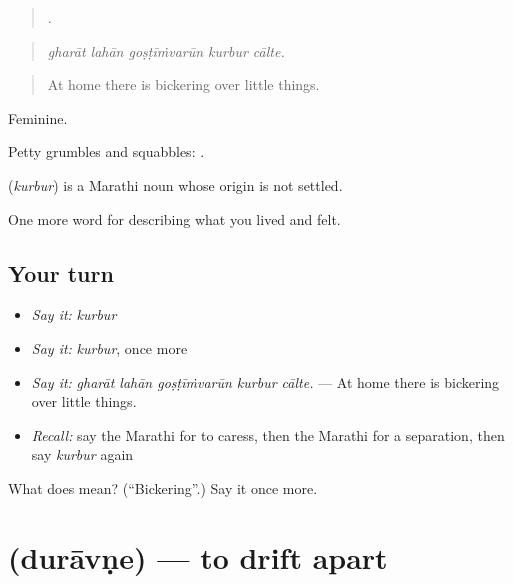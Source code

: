 \begin{quote}
    .
\end{quote}

\begin{quote}
\emph{gharāt lahān goṣṭīṁvarūn kurbur cālte.}
\end{quote}

\begin{quote}
At home there is bickering over little things.
\end{quote}

Feminine.

Petty grumbles and squabbles:  .

\begin{cousinweb}
\textbf{} (\emph{kurbur}) is a Marathi noun whose origin is not settled.
\end{cousinweb}

\begin{grammarlens}[title={What you've built}]
One more word for describing what you lived and felt.
\end{grammarlens}

\subsection*{Your turn}
\begin{itemize}
\raggedright
  \item \emph{Say it:} \emph{kurbur}
  \item \emph{Say it:} \emph{kurbur}, once more
  \item \emph{Say it:} \emph{gharāt lahān goṣṭīṁvarūn kurbur cālte.} — At home there is bickering over little things.
  \item \emph{Recall:} say the Marathi for to caress, then the Marathi for a separation, then say \emph{kurbur} again
\end{itemize}

\begin{tcolorbox}[breakable,colback=teal!4,colframe=teal!35!black,title={Before you move on}]
What does  mean? (\textquotedblleft{}Bickering\textquotedblright{}.) Say it once more.
\end{tcolorbox}
\section[\texorpdfstring{\mr{दुरावणे} (durāvṇe)}{दुरावणे (durāvṇe)}]{ (durāvṇe) — to drift apart}

